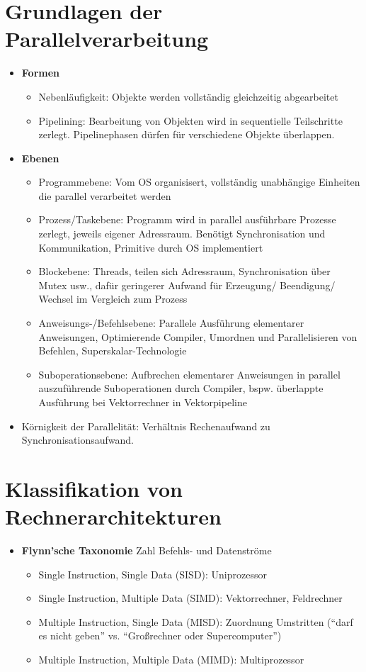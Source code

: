 \section{Grundlagen der Parallelverarbeitung}
\begin{itemize}
	\item \textbf{Formen} 
	\begin{itemize}
		\item Nebenläufigkeit: Objekte werden vollständig gleichzeitig abgearbeitet
		\item Pipelining: Bearbeitung von Objekten wird in sequentielle Teilschritte zerlegt. Pipelinephasen dürfen für verschiedene Objekte überlappen.	
	\end{itemize}
	\item \textbf{Ebenen}
	\begin{itemize}
		\item Programmebene: Vom OS organisisert, vollständig unabhängige Einheiten die parallel verarbeitet werden
		\item Prozess/Taskebene: Programm wird in parallel ausführbare Prozesse zerlegt, jeweils eigener Adressraum. Benötigt Synchronisation und Kommunikation, Primitive durch OS implementiert
		\item Blockebene: Threads, teilen sich Adressraum, Synchronisation über Mutex usw., dafür geringerer Aufwand für Erzeugung/ Beendigung/ Wechsel im Vergleich zum Prozess
	\item Anweisungs-/Befehlsebene: Parallele Ausführung elementarer Anweisungen, Optimierende Compiler, Umordnen und Parallelisieren von Befehlen, Superskalar-Technologie
		\item Suboperationsebene: Aufbrechen elementarer Anweisungen in parallel auszuführende Suboperationen durch Compiler, bspw. überlappte Ausführung bei Vektorrechner in Vektorpipeline
	\end{itemize}
	\item Körnigkeit der Parallelität: Verhältnis Rechenaufwand zu Synchronisationsaufwand.
\end{itemize}

\section{Klassifikation von Rechnerarchitekturen}
\begin{itemize}
	\item \textbf{Flynn'sche Taxonomie} Zahl Befehls- und Datenströme
	\begin{itemize}
		\item Single Instruction, Single Data (SISD): Uniprozessor
		\item Single Instruction, Multiple Data (SIMD): Vektorrechner, Feldrechner
		\item Multiple Instruction, Single Data (MISD): Zuordnung Umstritten ("`darf es nicht geben"' vs. "`Großrechner oder Supercomputer"')
		\item Multiple Instruction, Multiple Data (MIMD): Multiprozessor
	\end{itemize}
\end{itemize}
